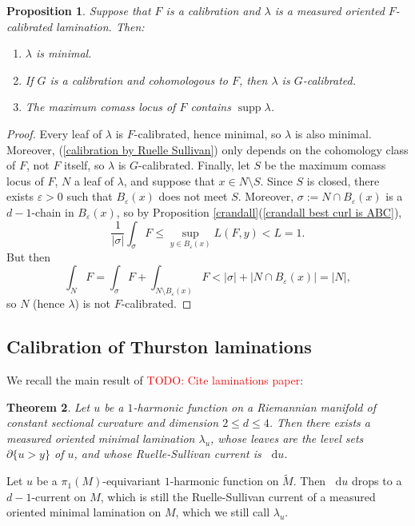 \documentclass[reqno,11pt]{amsart}
\newcommand*\dif{\mathop{}\!\mathrm{d}}
\DeclareMathOperator{\supp}{supp}
\newtheorem{theorem}{Theorem}[section]
\newtheorem{proposition}[theorem]{Proposition}
\theoremstyle{definition}
\numberwithin{equation}{section}
\newcommand\todo[1]{\textcolor{red}{TODO: #1}}
\begin{document}
\begin{proposition}\label{properties of calibrated laminations}
Suppose that $F$ is a calibration and $\lambda$ is a measured oriented $F$-calibrated lamination.
Then:
\begin{enumerate}
\item $\lambda$ is minimal.
\item If $G$ is a calibration and cohomologous to $F$, then $\lambda$ is $G$-calibrated.
\item The maximum comass locus of $F$ contains $\supp \lambda$.
\end{enumerate}
\end{proposition}
\begin{proof}
Every leaf of $\lambda$ is $F$-calibrated, hence minimal, so $\lambda$ is also minimal.
Moreover, (\ref{calibration by Ruelle Sullivan}) only depends on the cohomology class of $F$, not $F$ itself, so $\lambda$ is $G$-calibrated.
Finally, let $S$ be the maximum comass locus of $F$, $N$ a leaf of $\lambda$, and suppose that $x \in N \setminus S$.
Since $S$ is closed, there exists $\varepsilon > 0$ such that $B_\varepsilon(x)$ does not meet $S$.
Moreover, $\sigma := N \cap B_\varepsilon(x)$ is a $d-1$-chain in $B_\varepsilon(x)$, so by Proposition \ref{crandall}(\ref{crandall best curl is ABC}),
$$\frac{1}{|\sigma|} \int_\sigma F \leq \sup_{y \in B_\varepsilon(x)} L(F, y) < L = 1.$$
But then 
$$\int_N F = \int_\sigma F + \int_{N \setminus B_\varepsilon(x)} F < |\sigma| + |N \cap B_\varepsilon(x)| = |N|,$$
so $N$ (hence $\lambda$) is not $F$-calibrated.
\end{proof}


\subsection{Calibration of Thurston laminations}
We recall the main result of \todo{Cite laminations paper}:

\begin{theorem}
Let $u$ be a $1$-harmonic function on a Riemannian manifold of constant sectional curvature and dimension $2 \leq d \leq 4$.
Then there exists a measured oriented minimal lamination $\lambda_u$, whose leaves are the level sets $\partial \{u > y\}$ of $u$, and whose Ruelle-Sullivan current is $\dif u$.
\end{theorem}

Let $u$ be a $\pi_1(M)$-equivariant $1$-harmonic function on $\tilde M$.
Then $\dif u$ drops to a $d-1$-current on $M$, which is still the Ruelle-Sullivan current of a measured oriented minimal lamination on $M$, which we still call $\lambda_u$.
\end{document}
